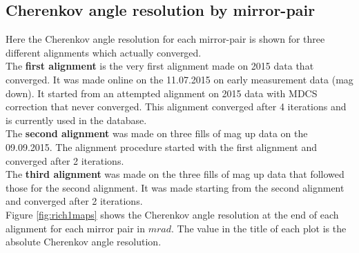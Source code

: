 \subsection{Cherenkov angle resolution by mirror-pair}
Here the Cherenkov angle resolution for each mirror-pair is shown for three different alignments which actually converged. \\
The \textbf{first alignment} is the very first alignment made on 2015 data that converged. It was made online on the 11.07.2015 on early measurement data (mag down). It started from an attempted alignment on 2015 data with MDCS correction that never converged. This alignment converged after 4 iterations and is currently used in the database.\\
The \textbf{second alignment} was made on three fills of mag up data on the 09.09.2015. The alignment procedure started with the first alignment and converged after 2 iterations.\\
The \textbf{third alignment} was made on the three fills of mag up data that followed those for the second alignment. It was made starting from the second alignment and converged after 2 iterations.\\
Figure \ref{fig:rich1maps} shows the Cherenkov angle resolution at the end of each alignment for each mirror pair in $mrad$. The value in the title of each plot is the absolute Cherenkov angle resolution.\\

